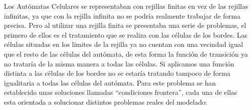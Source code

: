 Los Autómatas Celulares se representaban con rejillas finitas en vez de las rejillas infinitas, ya que con la rejilla infinita no se podría realmente trabajar de forma precisa. Pero al utilizar una rejilla finita se presentaba una serie de problemas, el primero de ellos es el tratamiento que se realiza con las células de los bordes. Las células situadas en los limites de la rejilla ya no cuentan con una vecindad igual que el resto de las células del autómata, de esta forma la función de transición ya no trataría de la misma manera a todas las células. Si aplicamos una función  distinta a las células de los bordes no se estaría tratando tampoco de forma igualitaria a todas las células del autómata. Para este problema se han establecido unas soluciones llamadas ``condiciones frontera'', cada una de ellas esta orientada a solucionar distintos problemas reales del modelado:
